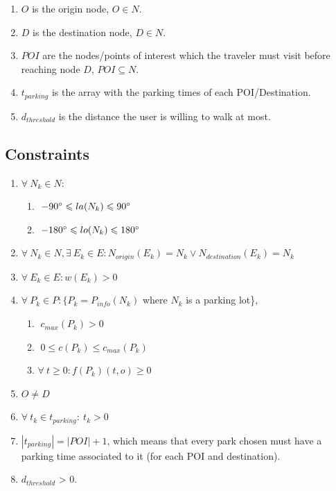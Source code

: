 \documentclass[a4paper, 12pt]{report}
\begin{document}
\begin{enumerate}
        \item $O$ is the origin node, $O \in N$.
        \item $D$ is the destination node, $D \in N$.
        \item $POI$ are the nodes/points of interest which the traveler must visit before reaching node $D$, $POI \subseteq N$.
        \item $t_{parking}$ is the array with the parking times of each POI/Destination.
        \item $d_{threshold}$ is the distance the user is willing to walk at most.
    \end{enumerate}
    
    \subsection{Constraints}
    
    \begin{enumerate}
        \item $\forall \: N_k \in N : $
        \begin{enumerate}
            \item $ \; -90\degree \leqslant la(N_k) \leqslant 90\degree $
            \item $ \; -180\degree \leqslant lo(N_k) \leqslant 180\degree$
        \end{enumerate}
        \item $\forall \: N_k \in N, \exists \: E_k \in E : N_{origin}(E_k) = N_k \lor  N_{destination}(E_k) = N_k $
        \item $\forall \: E_k \in E : w(E_k) > 0$ 
        \item $\forall \: P_{k} \in P : \{P_k = P_{info}(N_k)$ where $N_k$ is a parking lot\}, 
        \begin{enumerate}
            \item $ \; c_{max}(P_k) > 0 \;$
            \item $\; 0 \leqslant c(P_k) \leqslant  c_{max}(P_k) \;$
            \item $ \forall \: t \geqslant 0: f(P_k)(t,o) \geqslant 0$
        \end{enumerate}
        \item $O \neq D$
        \item $\forall \: t_k \in t_{parking}: \: t_k > 0$
        \item $|t_{parking}| = |POI| + 1$, which means that every park chosen must have a parking time associated to it (for each POI and destination).
        \item $d_{threshold}$ > 0.
    \end{enumerate}
    
\end{document}
